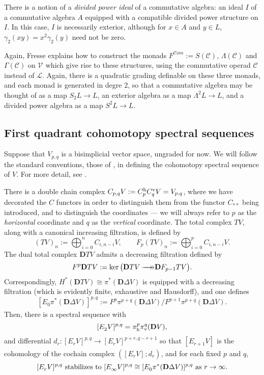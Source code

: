 \documentclass[11pt]{amsart}
\theoremstyle{plain}
\theoremstyle{definition}
\renewcommand{\ker}{\textup{ker}\,}
\renewcommand{\to}{\longrightarrow}
\newcommand{\scrL}{\mathscr{L}}
\newcommand{\scrC}{\mathscr{C}}
\newcommand{\calV}{\mathcal{V}}
\theoremstyle{plain}
\newcommand{\LieOperad}{{\scrL}}
\newcommand{\CommOperad}{{\scrC}}
\newcommand{\vect}[2]{\calV^{#1}_{#2}}
\newcommand{\epi}{{\,\makebox[0cm][l]{\ensuremath\to}\to}}
\newcommand{\algs}{{\scrC\!\textit{om}}}
\newcommand{\E}[5]{[E^{#1}_{#2}#3]^{#4}_{#5}}
\newcommand{\uver}{^\textup{v}}
\newcommand{\uhor}{^\textup{h}}
\newcommand{\dver}{_\textup{v}}
\newcommand{\dhor}{_\textup{h}}
\newcommand{\diag}{\Delta}
\newcommand{\dual}{\mathbf{D}}
\begin{document}
\begin{Conventions and notation}
There is a notion of a \emph{divided power ideal} of a commutative algebra: an ideal $I$ of a commutative algebra $A$ equipped with a compatible divided power structure on $I$. In this case, $I$ is necessarily exterior, although for $x\in A$ and $y\in L$, $\gamma_2(xy)=x^2\gamma_2(y)$ need not be zero.

Again, Fresse \cite{FresseSimplicialAlgs.pdf} explains how to construct the monads $F^{\algs}:=S(\CommOperad)$, $\Lambda(\CommOperad)$ and $\Gamma(\CommOperad)$ on $\vect{}{}$ which give rise to these structures, using the commutative operad $\CommOperad$ instead of $\LieOperad$. Again, there is a quadratic grading definable on these three monads, and each monad is generated in degre 2, so that a commutative algebra may be thought of as a  map $S_2L\to L$, an exterior algebra as a map $\Lambda^2L\to L$, and a divided power algebra as a map $S^2L\to L$.



















\subsection{First quadrant cohomotopy spectral sequences}
Suppose that $V_{p,q}$ is a bisimplicial vector space, ungraded for now. We will follow the standard conventions, those of \cite{MR2245560}, in defining the cohomotopy spectral sequence of $V$. For  more detail, see \cite[\S1.15{}]{MR2245560}.   

There is a double chain complex $C_{p,q}V:=C\uhor_p C\uver_q V=V_{p,q}$, where we have decorated the $C$ functors in order to distinguish them from the functor $C_{**}$ being introduced, and to distinguish the coordinates --- we will always refer to $p$ as the \emph{horizontal} coordinate and $q$ as the \emph{vertical} coordinate. The total complex $TV$, along with a canonical increasing filtration, is defined by 
\[(TV)_n:=\bigoplus_{i=0}^{n}C_{i,n-i}V,\qquad F_p(TV)_n:=\bigoplus_{i=0}^{p}C_{i,n-i}V.\]
The dual total complex $\dual TV$ admits a decreasing filtration defined by
\[F^p\dual TV:=\ker\bigl(\dual TV\epi \dual F_{p-1} TV\bigr).\]
Correspondingly, $H^*(\dual TV)\cong \pi^*(\dual\diag V)$ is equipped with a decreasing filtration (which is evidently finite, exhaustive and Hausdorff), and one defines
\[\E{}{0}{\pi^*(\dual\diag V)}{p,q}{}:=F^{p}\pi^{p+q}(\dual\diag V)/F^{p+1}\pi^{p+q}(\dual\diag V).\]
Then, there is a spectral sequence with
\[\E{}{2}{V}{p,q}{}=\pi\dhor^{p}\pi\dver^{q}(\dual V),\]
and differential $d_r:\E{}{r}{V}{p,q}{}\to \E{}{r}{V}{p+r,q-r+1}{}$ so that $\E{}{r+1}{V}{}{}$ is the cohomology of the cochain complex $(\E{}{r}{V}{}{};d_r)$, and for each fixed $p$ and $q$,
\[\E{}{r}{V}{p,q}{}\textup{ stabilizes to }\E{}{\infty}{V}{p,q}{}\cong \E{}{0}{\pi^*(\dual\diag V)}{p,q}{}\textup{ as $r\rightarrow\infty$}.\]


\end{Conventions and notation}
\end{document}
